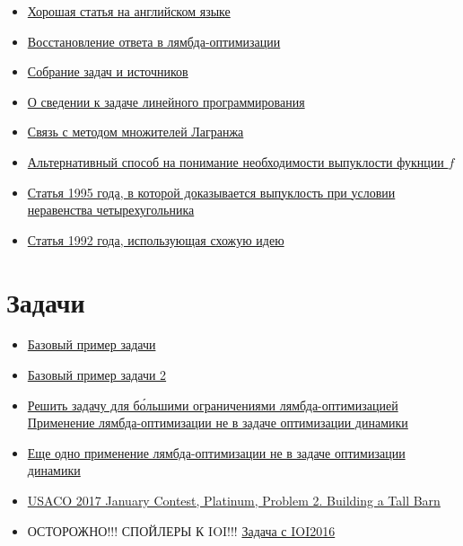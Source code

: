 \begin{itemize}
    \item \href{https://mamnoonsiam.github.io/posts/attack-on-aliens.html}{Хорошая статья на английском языке}
    \item \href{https://codeforces.com/blog/entry/92842}{Восстановление ответа в лямбда-оптимизации}
    \item \href{https://usaco.guide/adv/lagrange}{Собрание задач и источников}
    \item \href{https://codeforces.com/blog/entry/68778?#comment-700891}{О сведении к задаче линейного программирования}
    \item \href{https://codeforces.com/blog/entry/68778?#comment-531862}{Связь с методом множителей Лагранжа}
    \item \href{https://codeforces.com/blog/entry/69625?#comment-541307}{Альтернативный способ на понимание необходимости выпуклости фукнции $f$}
    \item \href{https://cse.hkust.edu.hk/mjg_lib/bibs/DPSu/DPSu.Files/sdarticle_204.pdf}{Статья 1995 года, в которой доказывается выпуклость при условии неравенства четырехугольника}
    \item \href{https://web.archive.org/web/20210511084902/https://www.osti.gov/servlets/purl/10146169}{Статья 1992 года, использующая схожую идею}
\end{itemize}

\section{Задачи}

\begin{itemize}
    \item \href{https://oj.uz/problem/view/NOI19_feast}{Базовый пример задачи}
    \item \href{https://codeforces.com/contest/1279/problem/F}{Базовый пример задачи 2}
    \item \href{https://codeforces.com/contest/739/problem/E}{Решить задачу для б\'{о}льшими ограничениями лямбда-оптимизацией}
    \href{https://open.kattis.com/problems/blazingnewtrails}{Применение лямбда-оптимизации не в задаче оптимизации динамики}
    \item \href{http://81.4.170.42:8980/training/#/task/Tennis/statement}{Еще одно применение лямбда-оптимизации не в задаче оптимизации динамики}
    \item \href{http://www.usaco.org/index.php?page=viewproblem2&cpid=697}{USACO 2017 January Contest, Platinum, Problem 2. Building a Tall Barn}
    \item ОСТОРОЖНО!!! СПОЙЛЕРЫ К IOI!!! \href{https://oj.uz/problem/view/IOI16_aliens}{Задача с IOI2016}
\end{itemize}
